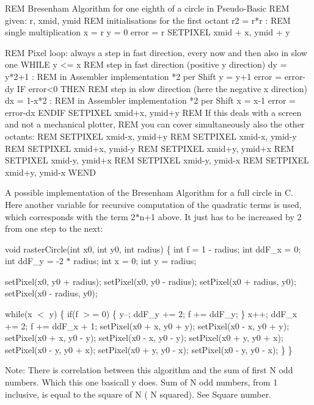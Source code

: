 \begin{DoxyVerb}REM Bresenham Algorithm for one eighth of a circle in Pseudo-Basic
REM given: r, xmid, ymid
REM initialisations for the first octant
r2 = r*r : REM single multiplication
x = r
y = 0
error = r
SETPIXEL xmid + x, ymid + y

REM Pixel loop: always a step in fast direction, every now and then also in slow one
WHILE y <= x
   REM step in fast direction (positive y direction)
   dy = y*2+1 : REM in Assembler implementation *2 per Shift
   y = y+1
   error = error-dy
   IF error<0 THEN
      REM step in slow direction (here the negative x direction)
      dx = 1-x*2 : REM in Assembler implementation *2 per Shift
      x = x-1
      error = error-dx
      ENDIF
   SETPIXEL  xmid+x, ymid+y
   REM If this deals with a screen and not a mechanical plotter,
   REM you can cover simultaneously also the other octants:
   REM SETPIXEL xmid-x, ymid+y
   REM SETPIXEL xmid-x, ymid-y
   REM SETPIXEL xmid+x, ymid-y
   REM SETPIXEL xmid+y, ymid+x
   REM SETPIXEL xmid-y, ymid+x
   REM SETPIXEL xmid-y, ymid-x
   REM SETPIXEL xmid+y, ymid-x
   WEND
\end{DoxyVerb}


A possible implementation of the Bresenham Algorithm for a full circle in C. Here another variable for recursive computation of the quadratic terms is used, which corresponds with the term 2$\ast$n+1 above. It just has to be increased by 2 from one step to the next\+:

void raster\+Circle(int x0, int y0, int radius) \{ int f = 1 -\/ radius; int dd\+F\+\_\+x = 0; int dd\+F\+\_\+y = -\/2 $\ast$ radius; int x = 0; int y = radius;

set\+Pixel(x0, y0 + radius); set\+Pixel(x0, y0 -\/ radius); set\+Pixel(x0 + radius, y0); set\+Pixel(x0 -\/ radius, y0);

while(x $<$ y) \{ if(f $>$= 0) \{ y--; dd\+F\+\_\+y += 2; f += dd\+F\+\_\+y; \} x++; dd\+F\+\_\+x += 2; f += dd\+F\+\_\+x + 1; set\+Pixel(x0 + x, y0 + y); set\+Pixel(x0 -\/ x, y0 + y); set\+Pixel(x0 + x, y0 -\/ y); set\+Pixel(x0 -\/ x, y0 -\/ y); set\+Pixel(x0 + y, y0 + x); set\+Pixel(x0 -\/ y, y0 + x); set\+Pixel(x0 + y, y0 -\/ x); set\+Pixel(x0 -\/ y, y0 -\/ x); \} \}

Note\+: There is correlation between this algorithm and the sum of first N odd numbers. Which this one basicall y does. Sum of N odd numbers, from 1 inclusive, is equal to the square of N ( N squared). See Square number.

